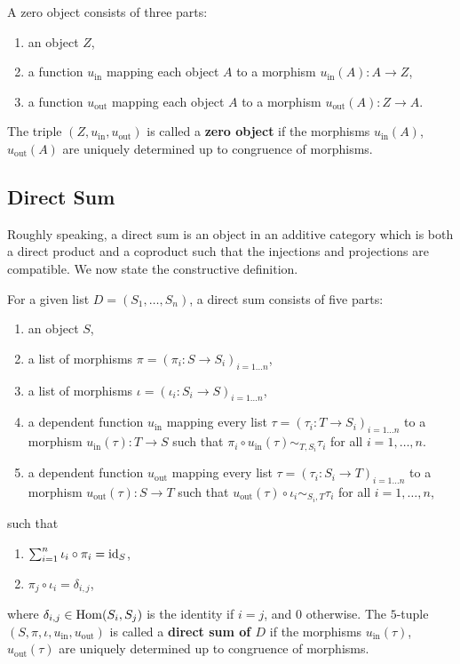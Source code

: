\begin{definition}
  A zero object consists of three parts:
  \begin{enumerate}
   \item an object $Z$,
   \item a function $u_{\mathrm{in}}$ mapping each object $A$ to a morphism $u_{\mathrm{in}}(A): A \rightarrow Z$,
   \item a function $u_{\mathrm{out}}$ mapping each object $A$ to a morphism $u_{\mathrm{out}}(A): Z \rightarrow A$.
  \end{enumerate}
  The triple $(Z, u_{\mathrm{in}}, u_{\mathrm{out}})$ is called a \textbf{zero object} if the morphisms 
  $u_{\mathrm{in}}(A)$, $u_{\mathrm{out}}(A)$ are uniquely determined up to congruence of morphisms.
\end{definition}


\subsection{Direct Sum}

Roughly speaking, a direct sum is an object in an additive category which is both a direct product and
a coproduct such that the injections and projections are compatible.
We now state the constructive definition.

\begin{definition}\label{definition:direct_sum}
 For a given list $D = (S_1, \dots, S_n)$, a direct sum consists of five parts:
 \begin{enumerate}
  \item an object $S$,
  \item a list of morphisms $\pi = (\pi_i: S \rightarrow S_i)_{i = 1 \dots n}$,
  \item a list of morphisms $\iota = (\iota_i: S_i \rightarrow S)_{i = 1 \dots n}$,
  \item a dependent function $u_{\mathrm{in}}$ mapping every list $\tau = ( \tau_i: T \rightarrow S_i )_{i = 1 \dots n}$
        to a morphism $u_{\mathrm{in}}(\tau): T \rightarrow S$ such that
        $\pi_i \circ u_{\mathrm{in}}(\tau) \sim_{T,S_i} \tau_i$ for all $i = 1, \dots, n$.
  \item a dependent function $u_{\mathrm{out}}$ mapping every list $\tau = ( \tau_i: S_i \rightarrow T )_{i = 1 \dots n}$
        to a morphism $u_{\mathrm{out}}(\tau): S \rightarrow T$ such that
        $u_{\mathrm{out}}(\tau) \circ \iota_i \sim_{S_i, T} \tau_i$ for all $i = 1, \dots, n$,
 \end{enumerate}
 such that
 \begin{enumerate}
  \item $\sum_{i=1}^{n} \iota_i \circ \pi_i = \mathrm{id}_S$,
  \item $\pi_j \circ \iota_i = \delta_{i,j}$,
 \end{enumerate}
  where $\delta_{i,j} \in \operatorname{\mathrm{Hom}}( S_i, S_j )$ is the identity if $i=j$, and $0$ otherwise.
  The $5$-tuple $(S, \pi, \iota, u_{\mathrm{in}}, u_{\mathrm{out}})$ is called a \textbf{direct sum of $D$}
  if the morphisms 
  $u_{\mathrm{in}}(\tau)$, $u_{\mathrm{out}}(\tau)$ are uniquely determined up to congruence of morphisms.
\end{definition}

